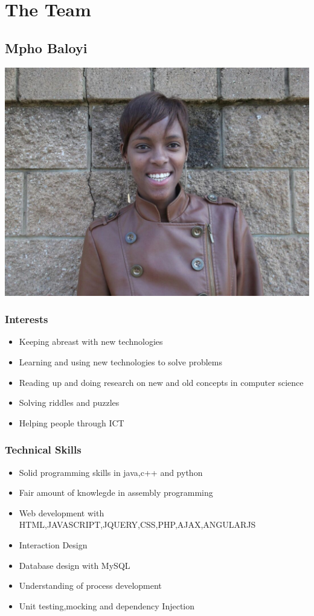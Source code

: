\documentclass[a4paper,12pt]{article}
\begin{document}
\newpage
\tableofcontents
\newpage
\section{The Team}
\subsection{Mpho Baloyi}
\includegraphics[width=\textwidth]{images/Mpho}
\subsubsection{Interests}
\begin{itemize}
\item Keeping abreast with new technologies
\item Learning and using new technologies to solve problems
\item Reading up and doing research on new and old concepts in computer science
\item Solving riddles and puzzles
\item Helping people through ICT
\end{itemize}
\subsubsection{Technical Skills}
\begin{itemize}
\item Solid programming skills in java,c++ and python
\item Fair amount of knowlegde in assembly programming
\item Web development with HTML,JAVASCRIPT,JQUERY,CSS,PHP,AJAX,ANGULARJS
\item Interaction Design
\item Database design with MySQL
\item Understanding of process development
\item Unit testing,mocking and dependency Injection
\end{itemize}
\end{document}
